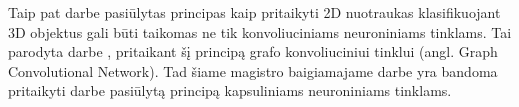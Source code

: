Taip pat darbe \cite{cnnExp1} pasiūlytas principas kaip pritaikyti 2D nuotraukas klasifikuojant 3D objektus gali būti taikomas ne tik konvoliuciniams neuroniniams tinklams. Tai parodyta darbe \cite{MVGCN}, pritaikant šį principą grafo konvoliuciniui tinklui (angl. Graph Convolutional Network). Tad šiame magistro baigiamajame darbe yra bandoma pritaikyti darbe \cite{cnnExp1} pasiūlytą principą kapsuliniams neuroniniams tinklams.
